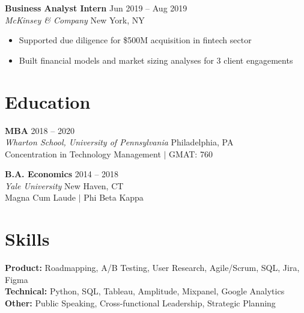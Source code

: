 \documentclass[11pt,letterpaper]{article}
\begin{document}
\textbf{\color{heading}Business Analyst Intern} \hfill {\small Jun 2019 -- Aug 2019} \\
{\color{subheading}\textit{McKinsey \& Company}} \hfill {\small\color{subheading} New York, NY}
\begin{itemize}[leftmargin=1.2em, topsep=2pt, itemsep=0pt, parsep=1pt]
  \item Supported due diligence for \$500M acquisition in fintech sector
  \item Built financial models and market sizing analyses for 3 client engagements
\end{itemize}

\section{Education}

\textbf{\color{heading}MBA} \hfill {\small 2018 -- 2020} \\
{\color{subheading}\textit{Wharton School, University of Pennsylvania}} \hfill {\small\color{subheading} Philadelphia, PA} \\
{\small Concentration in Technology Management $|$ GMAT: 760}
\vspace{4pt}

\textbf{\color{heading}B.A. Economics} \hfill {\small 2014 -- 2018} \\
{\color{subheading}\textit{Yale University}} \hfill {\small\color{subheading} New Haven, CT} \\
{\small Magna Cum Laude $|$ Phi Beta Kappa}

\section{Skills}

\textbf{\color{heading}Product:} Roadmapping, A/B Testing, User Research, Agile/Scrum, SQL, Jira, Figma \\[2pt]
\textbf{\color{heading}Technical:} Python, SQL, Tableau, Amplitude, Mixpanel, Google Analytics \\[2pt]
\textbf{\color{heading}Other:} Public Speaking, Cross-functional Leadership, Strategic Planning
\end{document}
